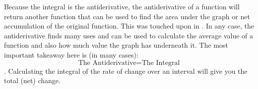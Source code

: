\documentclass[../revisedmain.tex]{subfiles}
\begin{document}
Because the integral is the antiderivative, the antiderivative of a function will return another function that can be used to find the area under the graph or net accumulation of the original function. This was touched upon in . In any case, the antiderivative finds many uses and can be used to calculate the average value of a function and also how much value the graph has underneath it. The most important takeaway here is (in many cases):$$\text{The Antiderivative} = \text{The Integral}$$. Calculating the integral of the rate of change over an interval will give you the total (net) change.
\end{document}
